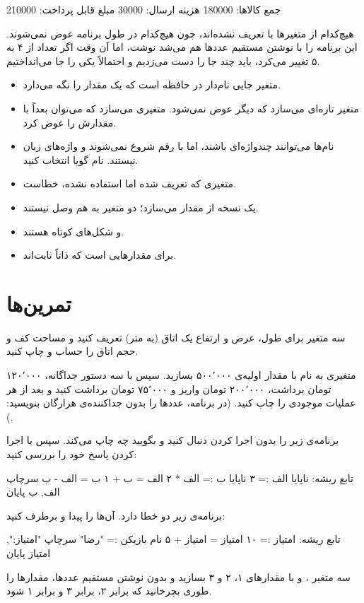 \begin{outputfa}
جمع کالاها: 180000
هزینه ارسال: 30000
مبلغ قابل پرداخت: 210000
\end{outputfa}

هیچ‌کدام از متغیرها با  تعریف نشده‌اند، چون هیچ‌کدام در طول
برنامه عوض نمی‌شوند. این برنامه را با نوشتن مستقیم عددها هم می‌شد نوشت،
اما آن وقت اگر تعداد از ۴ به ۵ تغییر می‌کرد، باید چند جا را دست می‌زدیم و
احتمالاً یکی را جا می‌انداختیم.

\begin{summary}
\begin{itemize}
  \item متغیر جایی نام‌دار در حافظه است که یک مقدار را نگه می‌دارد.
  \item {} متغیر تازه‌ای می‌سازد که دیگر عوض نمی‌شود.
         متغیری می‌سازد که می‌توان بعداً با
        \code{=} مقدارش را عوض کرد.
  \item نام‌ها می‌توانند چندواژه‌ای باشند، اما با رقم شروع نمی‌شوند و
        واژه‌های زبان نیستند. نام گویا انتخاب کنید.
  \item متغیری که تعریف شده اما استفاده نشده، خطاست.
  \item {} یک نسخه از مقدار می‌سازد؛ دو متغیر به هم وصل
        نیستند.
  \item {} و  شکل‌های کوتاه
         هستند.
  \item {} برای مقدارهایی است که ذاتاً ثابت‌اند.
\end{itemize}
\end{summary}

\section*{تمرین‌ها}

\exercise سه متغیر برای طول، عرض و ارتفاع یک اتاق (به متر) تعریف کنید و
مساحت کف و حجم اتاق را حساب و چاپ کنید.

\exercise متغیری به نام  با مقدار اولیه‌ی ۵۰۰٬۰۰۰ بسازید.
سپس با سه دستور جداگانه، ۱۲۰٬۰۰۰ تومان برداشت، ۲۰۰٬۰۰۰ تومان واریز و
۷۵٬۰۰۰ تومان برداشت کنید و بعد از هر عملیات موجودی را چاپ کنید. (در
برنامه، عددها را بدون جداکننده‌ی هزارگان بنویسید: .)

\exercise برنامه‌ی زیر را بدون اجرا کردن دنبال کنید و بگویید چه چاپ
می‌کند. سپس با اجرا کردن پاسخ خود را بررسی کنید:
\begin{salamfa}
تابع ریشه:
    ناپایا الف := ۳
    ناپایا ب := الف * ۲
    الف = ب + ۱
    ب = الف - ب
    سرچاپ الف, ب
پایان
\end{salamfa}

\exercise برنامه‌ی زیر دو خطا دارد. آن‌ها را پیدا و برطرف کنید:
\begin{salamfa}
تابع ریشه:
    امتیاز := ۱۰
    امتیاز = امتیاز + ۵
    نام بازیکن := "رضا"
    سرچاپ "امتیاز:", امتیاز
پایان
\end{salamfa}

\exercise سه متغیر ،  و  با مقدارهای ۱، ۲
و ۳ بسازید و بدون نوشتن مستقیم عددها، مقدارها را طوری بچرخانید که
 برابر ۲،  برابر ۳ و  برابر ۱ شود.
